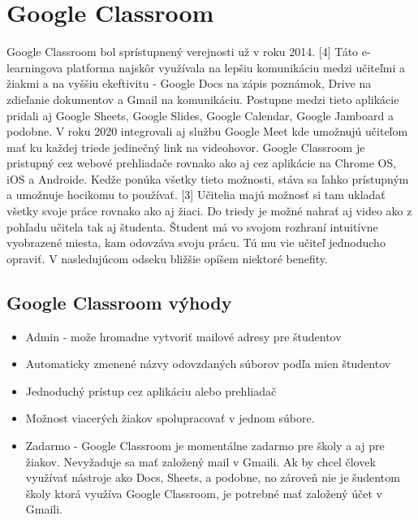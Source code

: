 \documentclass[10pt,twoside,slovak,a4paper]{article}
\begin{document}
\section{Google Classroom} \label{Google Classroom}

Google Classroom bol sprístupnený verejnosti už v roku 2014. [4] Táto e-learningova platforma najskôr využívala na lepšiu komunikáciu medzi učiteľmi a žiakmi a na vyššiu ekeftivitu - Google Docs na zápis poznámok, Drive na zdieľanie dokumentov a Gmail na komunikáciu. Postupne medzi tieto aplikácie pridali aj Google Sheets, Google Slides, Google Calendar, Google Jamboard a podobne. V roku 2020 integrovali aj službu Google Meet kde umožnujú učiteľom mať ku každej triede jedinečný link na videohovor. Google Classroom je pristupný cez webové prehliadače rovnako ako aj cez aplikácie na Chrome OS, iOS a Androide. Kedže ponúka všetky tieto možnosti, stáva sa ľahko prístupným a umožnuje hocikomu to používať. [3] Učitelia majú možnosť si tam ukladať všetky svoje práce rovnako ako aj žiaci. Do triedy je možné nahrať aj video ako z pohľadu učitela tak aj študenta. Študent má vo svojom rozhraní intuitívne vyobrazené miesta, kam odovzáva svoju prácu. Tú mu vie učiteľ jednoducho opraviť. V nasledujúcom odseku bližšie opíšem niektoré benefity.

\subsection{Google Classroom výhody} \label{Google Classroom: Google Classroom výhody}

\begin{itemize}
	\item Admin - može hromadne vytvoriť mailové adresy pre študentov
	\item Automaticky zmenené názvy odovzdaných súborov podľa mien študentov
	\item Jednoduchý prístup cez aplikáciu alebo prehliadač
	\item Možnost viacerých žiakov spolupracovať v jednom súbore.
	\item Zadarmo -
Google Classroom je momentálne zadarmo pre školy a aj pre žiakov. Nevyžaduje sa mať založený mail v Gmaili. Ak by chcel človek využívať nástroje ako Docs, Sheets, a podobne, no zároveň nie je šudentom školy ktorá využíva Google Classroom, je potrebné mať založený účet v Gmaili. 
	\end{itemize}
\end{document}
